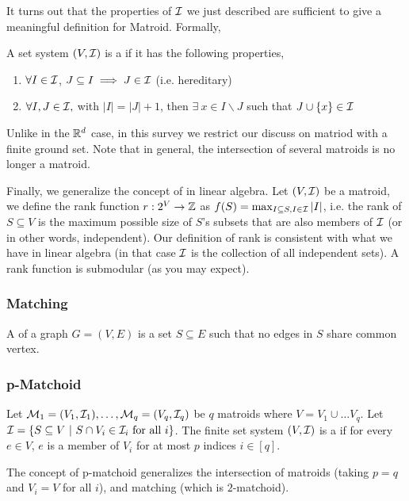 It turns out that the properties of $\mathcal{I}$ we just described are sufficient to give a meaningful definition for Matroid. Formally, 
\begin{definition}[Matroid]
\label{def:matroid}
  A set system $(V, \mathcal{I})$ is a  if it has the following properties,
  \begin{enumerate}
  \item $\forall I \in \mathcal{I}$, $J\subseteq I \implies J\in \mathcal{I}$ (i.e. hereditary)
  \item $\forall I, J \in \mathcal{I},$ with $|I| = |J| + 1$,  then $\exists~ x\in I\backslash J$ such that $J \cup \{x\}\in \mathcal{I}$ 
  \end{enumerate} 
\end{definition}
Unlike in the $\mathbb{R}^d$ case, in this survey we restrict our discuss on matriod with a finite ground set. Note that in general, the intersection of several matroids is no longer a matroid.


Finally, we generalize the concept of  in linear algebra. Let $(V, \mathcal{I})$ be a matroid, we define the rank function $r: 2^V \rightarrow \mathbb{Z}$ as $f(S) = \max_{I\subseteq S, I\in \mathcal{I}} |I|$, i.e. the rank of $S\subseteq V$ is the maximum possible size of $S$'s subsets that are also members of $\mathcal{I}$ (or in other words, independent). Our definition of rank is consistent with what we have in linear algebra (in that case $\mathcal{I}$ is the collection of all independent sets). A rank function is submodular (as you may expect).


\subsubsection{Matching}
A  of a graph $G = (V, E)$ is a set  $S\subseteq E$ such that no edges in $S$ share common vertex. 



\subsubsection{p-Matchoid}
Let $\mathcal{M}_1 = (V_1, \mathcal{I}_1),\ldots, \mathcal{M}_q = (V_q, \mathcal{I}_q)$ be $q$ matroids where $V = V_1\cup\ldots V_q$. Let $\mathcal{I} = \{S\subseteq V~|~ S\cap V_i \in \mathcal{I}_i ~\text{for all}~ i\}$. The finite set system $(V, \mathcal{I})$ is a  if for every $e\in V$, $e$ is a member of $V_i$ for at most $p$ indices $i \in [q]$. 

The concept of p-matchoid generalizes the intersection of matroids (taking $p = q$ and $V_i = V$ for all $i$), and matching (which is $2$-matchoid). 




